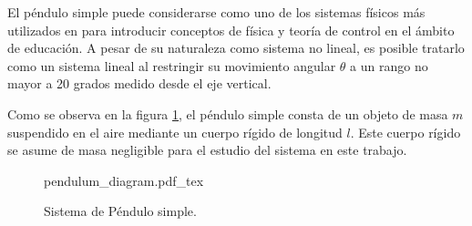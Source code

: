 
El péndulo simple puede considerarse como uno de los sistemas 
físicos más utilizados en  para introducir conceptos de física 
y teoría de control en el ámbito de educación. 
A pesar de su naturaleza como sistema no lineal, es posible tratarlo como
un sistema lineal al restringir su movimiento angular $\theta$ a un rango
no mayor a 20 grados medido desde el eje vertical.

Como se observa en la figura \ref{fig: simple pendulum}, 
el péndulo simple consta de un objeto de masa $m$ suspendido 
en el aire mediante un cuerpo rígido de longitud $l$. 
Este cuerpo rígido se asume de masa negligible para el estudio 
del sistema en este trabajo.

 \begin{figure}[ht]
    \centering
    {pendulum_diagram.pdf_tex}
    \caption{Sistema de Péndulo simple.}
    \label{fig: simple pendulum}
\end{figure}

